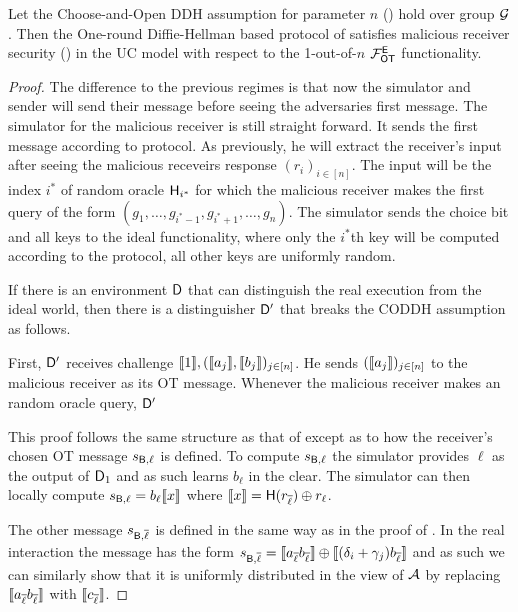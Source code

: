\begin{lemma}
	Let the Choose-and-Open DDH assumption for parameter $n$ () hold over group $\mathcal{G}$. Then the One-round Diffie-Hellman based protocol  of  satisfies malicious receiver security () in the UC model with respect to the 1-out-of-$n$ $\mathcal{F}_{\mathsf{OT}}^\mathsf{E}$ functionality.
\end{lemma}
\begin{proof}
The difference to the previous regimes is that now the simulator and sender will send their message before seeing the adversaries first message. The simulator for the malicious receiver is still straight forward. It sends the first message according to protocol. As previously, he will extract the receiver's input after seeing the malicious receveirs response $(r_i)_{i\in [n]}$. The input will be the index $i^*$ of random oracle $\mathsf{H}_{i^*}$ for which the malicious receiver makes the first query of the form $(g_1,\ldots,g_{i^*-1},g_{i^*+1},\ldots,g_n)$. The simulator sends the choice bit and all keys to the ideal functionality, where only the $i^*$th key will be computed according to the protocol, all other keys are uniformly random. 

If there is an environment $\mathsf D$ that can distinguish the real execution from the ideal world, then there is a distinguisher $\mathsf D'$ that breaks the CODDH assumption as follows. 

First, $\mathsf D'$ receives challenge $\llbracket 1\rrbracket, (\llbracket a_j\rrbracket,\llbracket b_j\rrbracket)_{j\in [n]}$. He sends $(\llbracket a_j\rrbracket)_{j\in [n]}$ to the malicious receiver as its OT message. Whenever the malicious receiver makes an random oracle query, $\mathsf D'$ 



	This proof follows the same structure as that of  except as to how the receiver's chosen OT message $s_{\mathsf{B}, \ell}$ is defined. To compute $s_{\mathsf{B}, \ell}$ the simulator provides $\ell$ as the output of $\mathsf D_1$ and as such learns $b_\ell$ in the clear. The simulator can then locally compute $s_{\mathsf{B}, \ell}=b_\ell\llbracket x\rrbracket$ where $\llbracket x\rrbracket=\mathsf{H}(r_{\overline \ell})\oplus r_\ell$. 
	
	The other message $s_{\mathsf{B},\overline \ell}$ is defined in the same way as in the proof of . In the real interaction the message has the form $s_{\mathsf{B},{\overline \ell}}=\llbracket a_{\overline{\ell}}b_{\overline{\ell}}\rrbracket \oplus \llbracket{(\delta_i+\gamma_j)b_{\overline{\ell}}}\rrbracket$ and as such we can similarly show that it is uniformly distributed in the view of $\mathcal{A}$ by replacing $\llbracket a_{\overline{\ell}}b_{\overline{\ell}}\rrbracket$ with $\llbracket c_{\overline{\ell}}\rrbracket$.
\end{proof}

